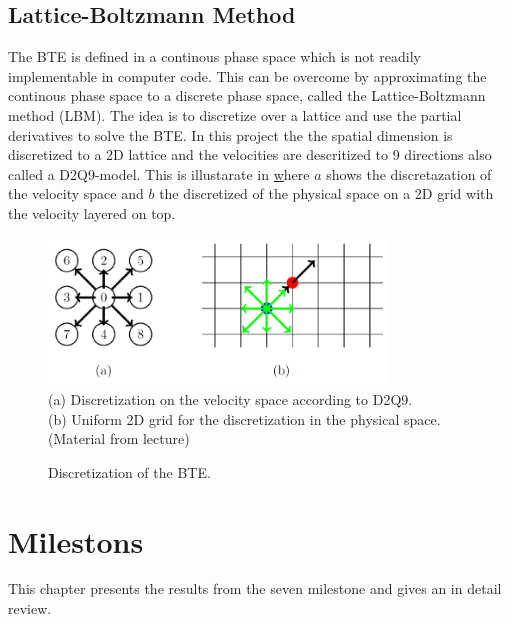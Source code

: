 \documentclass[a4paper,11pt]{article}
\begin{document}
\subsection{Lattice-Boltzmann Method} \label{sec:lbm}
The BTE is defined in a continous phase space which is not readily implementable in computer code.
This can be overcome by approximating the continous phase space to a discrete phase space, called the Lattice-Boltzmann method (LBM).
The idea is to discretize over a lattice and use the partial derivatives to solve the BTE.
In this project the the spatial dimension is discretized to a 2D lattice and the velocities are descritized to 9 directions also called a D2Q9-model.
This is illustarate in \href{fig:d2q9-scheme} where $a$ shows the discretazation of the velocity space and $b$ the discretized of the physical space on a 2D grid with the velocity layered on top.
\begin{figure}[h]
  \caption{Discretization of the BTE.}
  \label{fig:d2q9-scheme}
  \centering
  \includegraphics[width=9cm]{d2q9_scheme.png}\\
  (a) Discretization on the velocity space according to D2Q9.\\
  (b) Uniform 2D grid for the discretization in the physical space.\\
  \small{(Material from lecture)}
\end{figure}

\clearpage
\section{Milestons}
This chapter presents the results from the seven milestone and gives an in detail review.
\end{document}

